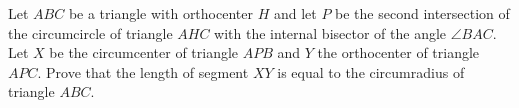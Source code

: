 Let $ABC$ be a triangle with orthocenter $H$ and let $P$ be the second intersection of the circumcircle of triangle $AHC$ with the internal bisector of the angle $\angle BAC$.  Let $X$ be the circumcenter of triangle $APB$ and $Y$ the orthocenter of triangle $APC$.  Prove that the length of segment $XY$ is equal to the circumradius of triangle $ABC$.